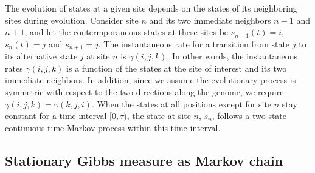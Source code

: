 \documentclass[11pt]{article}
\begin{document}
The evolution of states at a given site depends on the states of its
neighboring sites during evolution. Consider site $n$ and its two
immediate neighbors $n-1$ and $n+1$, and let the contermporaneous
states at these sites be $s_{n-1}(t) = i$, $s_n(t)=j$ and
$s_{n+1}=j$. The instantaneous rate for a transition from state $j$ to
its alternative state $\bar{j}$ at site $n$ is $\gamma(i, j, k)$. In
other words, the instantaneous rates $\gamma(i, j, k)$ is a function
of the states at the site of interest and its two immediate neighbors.
In addition, since we assume the evolutionary process is symmetric
with respect to the two directions along the genome, we require
$\gamma(i, j, k) = \gamma(k, j, i)$.
When the states at all positions except for site $n$ stay constant for
a time interval $[0,\tau)$, the state at site $n$, $s_n$, follows a
two-state continuous-time Markov process within this time interval.


\subsection{Stationary Gibbs measure as Markov chain}
\end{document}
